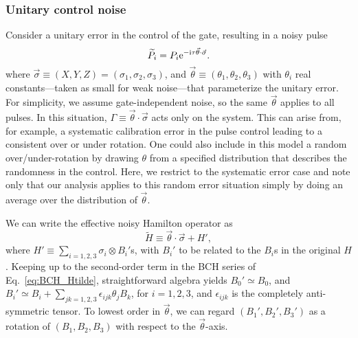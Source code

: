 \documentclass[twocolumn,pra,superscriptaddress]{revtex4-2}
\begin{document}
\subsubsection{Unitary control noise}\label{sec:gate-indepNoise}
Consider a unitary error in the control of the gate, resulting in a noisy pulse 
\begin{equation}
\widetilde P_i=P_i\mathrm{e}^{-\mathrm{i}\tau\vec\theta\cdot\vec\sigma}.
\end{equation}
where $\vec\sigma\equiv (X,Y,Z)=(\sigma_1,\sigma_2,\sigma_3)$, and $\vec \theta\equiv (\theta_1,\theta_2,\theta_3)$ with $\theta_i$ real constants---taken as small for weak noise---that parameterize the unitary error. For simplicity, we assume gate-independent noise, so the same $\vec\theta$ applies to all pulses. In this situation, $\Gamma\equiv \vec\theta\cdot\vec\sigma$ acts only on the system. This can arise from, for example, a systematic calibration error in the pulse control leading to a consistent over or under rotation. One could also include in this model a random over/under-rotation by drawing $\theta$ from a specified distribution that describes the randomness in the control. Here, we restrict to the systematic error case and note only that our analysis applies to this random error situation simply by doing an average over the distribution of $\vec\theta$.

We can write the effective noisy Hamilton operator as
\begin{equation}
\widetilde H\equiv \vec\theta\cdot\vec\sigma+H',
\end{equation}
where $H'\equiv \sum_{i=1,2,3}\sigma_i\otimes B_i'$s, with $B_i'$ to be related to the $B_i$s in the original $H$. Keeping up to the second-order term in the BCH series of Eq.~\eqref{eq:BCH_Htilde}, straightforward algebra yields $B_0'\simeq B_0$, and $B_i'\simeq B_i+\sum_{jk=1,2,3}\epsilon_{ijk}\theta_j B_k$, for $i=1,2,3$, and $\epsilon_{ijk}$ is the completely anti-symmetric tensor.
To lowest order in $\vec\theta$, we can regard $(B_1',B_2',B_3')$ as a rotation of $(B_1,B_2,B_3)$ with respect to the $\vec\theta$-axis. 
 
\end{document}
